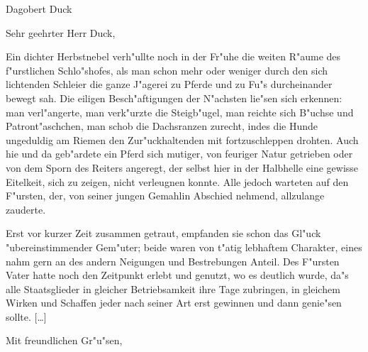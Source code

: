 \documentclass[finanz, rollstuhl, ddcfooter]{tudfax}
\begin{document}






\subject{Novelle}

\begin{letter}{Dagobert Duck}
    \opening{Sehr geehrter Herr Duck,}
        Ein dichter Herbstnebel verh"ullte noch in der Fr"uhe die weiten R"aume des
        f"urstlichen Schlo"shofes, als man schon mehr oder weniger durch den sich
        lichtenden Schleier die ganze J"agerei zu Pferde und zu Fu"s durcheinander
        bewegt sah. Die eiligen Besch"aftigungen der N"achsten lie"sen sich erkennen:
        man verl"angerte, man verk"urzte die Steigb"ugel, man reichte sich B"uchse
        und Patront"aschchen, man schob die Dachsranzen zurecht, indes die Hunde
        ungeduldig am Riemen den Zur"uckhaltenden mit fortzuschleppen drohten. Auch
        hie und da geb"ardete ein Pferd sich mutiger, von feuriger Natur getrieben
        oder von dem Sporn des Reiters angeregt, der selbst hier in der Halbhelle
        eine gewisse Eitelkeit, sich zu zeigen, nicht verleugnen konnte. Alle jedoch
        warteten auf den F"ursten, der, von seiner jungen Gemahlin Abschied nehmend,
        allzulange zauderte.
        
        Erst vor kurzer Zeit zusammen getraut, empfanden sie schon das Gl"uck
        "ubereinstimmender Gem"uter; beide waren von t"atig lebhaftem Charakter, eines
        nahm gern an des andern Neigungen und Bestrebungen Anteil. Des F"ursten Vater
        hatte noch den Zeitpunkt erlebt und genutzt, wo es deutlich wurde, da"s alle
        Staatsglieder in gleicher Betriebsamkeit ihre Tage zubringen, in gleichem
        Wirken und Schaffen jeder nach seiner Art erst gewinnen und dann genie"sen sollte.
        [\ldots]
    \closing{Mit freundlichen Gr"u"sen,}
\end{letter}
\end{document}
